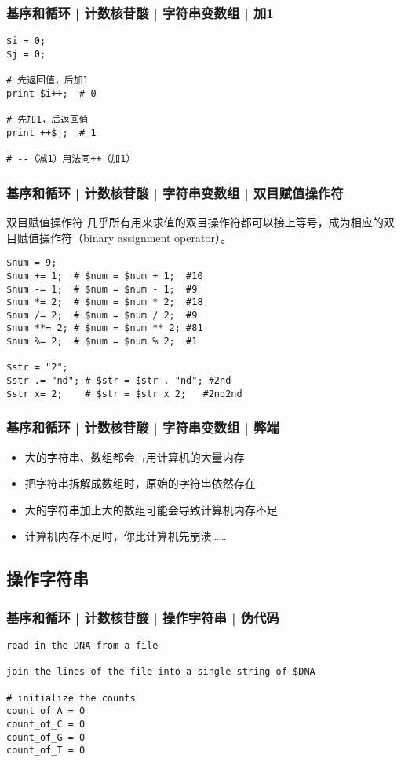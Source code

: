 \begin{frame}[fragile]
  \frametitle{基序和循环 | 计数核苷酸 | 字符串变数组 | \alert{加1}}
\begin{lstlisting}
$i = 0;
$j = 0;

# 先返回值，后加1
print $i++;  # 0

# 先加1，后返回值
print ++$j;  # 1

# --（减1）用法同++（加1）
\end{lstlisting}
\end{frame}

\begin{frame}[fragile]
  \frametitle{基序和循环 | 计数核苷酸 | 字符串变数组 | \alert{双目赋值操作符}}
  \vspace{-0.5em}
  \begin{block}{双目赋值操作符}
    几乎所有用来求值的双目操作符都可以接上等号，成为相应的双目赋值操作符（binary assignment operator）。
  \end{block}
  \pause
  \vspace{-0.5em}
\begin{lstlisting}
$num = 9;
$num += 1;  # $num = $num + 1;  #10
$num -= 1;  # $num = $num - 1;  #9
$num *= 2;  # $num = $num * 2;  #18
$num /= 2;  # $num = $num / 2;  #9
$num **= 2; # $num = $num ** 2; #81
$num %= 2;  # $num = $num % 2;  #1

$str = "2";
$str .= "nd"; # $str = $str . "nd"; #2nd
$str x= 2;    # $str = $str x 2;   #2nd2nd
\end{lstlisting}
\end{frame}

\begin{frame}
  \frametitle{基序和循环 | 计数核苷酸 | 字符串变数组 | 弊端}
  \begin{itemize}
    \item 大的字符串、数组都会占用计算机的大量内存
    \item 把字符串拆解成数组时，原始的字符串依然存在
    \item 大的字符串加上大的数组可能会导致计算机内存不足
    \item 计算机内存不足时，你比计算机先崩溃……
  \end{itemize}
\end{frame}

\subsection{操作字符串}
\begin{frame}[fragile]
  \frametitle{基序和循环 | 计数核苷酸 | 操作字符串 | 伪代码}
\begin{lstlisting}
read in the DNA from a file

join the lines of the file into a single string of $DNA

# initialize the counts
count_of_A = 0
count_of_C = 0
count_of_G = 0
count_of_T = 0
\end{lstlisting}
\end{frame}

